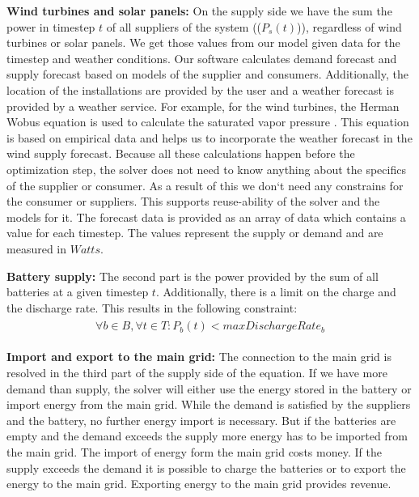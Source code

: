 \textbf{Wind turbines and solar panels:} On the supply side we have the sum the power in timestep $t$ of all suppliers of the system (($P_{s}(t)$)), regardless of wind turbines or solar panels.
We get those values from our model given data for the timestep and weather conditions. 
Our software calculates demand forecast and supply forecast based on models of the supplier and consumers. 
Additionally, the location of the installations are provided by the user and a weather forecast is provided by a weather service. 
For example, for the wind turbines, the Herman Wobus equation is used to calculate the saturated vapor pressure \cite{NOAA}. 
This equation is based on empirical data and helps us to incorporate the weather forecast in the wind supply forecast. 
Because all these calculations happen before the optimization step, the solver does not need to know anything about the specifics of the supplier or consumer. As a result of this we don`t need any constrains for the consumer or suppliers. 
This supports reuse-ability of the solver and the models for it. 
The forecast data is provided as an array of data which contains a value for each timestep. 
The values represent the supply or demand and are measured in $Watts$.  %

\textbf{Battery supply:} The second part is the power provided by the sum of all batteries at a given timestep $t$. Additionally, there is a limit on the charge and the discharge rate. This results in the following constraint:
\begin{align} \label{eq:limitDischarge}
\begin{split}
\forall b \in B, \forall t \in T: P_{b}(t) < maxDischargeRate_{b}
\end{split}
\end{align}

\textbf{Import and export to the main grid:} The connection to the main grid is resolved in the third part of the supply side of the equation.
If we have more demand than supply, the solver will either use the energy stored in the battery or import energy from the main grid. While the demand is satisfied by the suppliers and the battery, no further energy import is necessary. But if the batteries are empty and the demand exceeds the supply more energy has to be imported from the main grid. The import of energy form the main grid costs money. If the supply exceeds the demand it is possible to charge the batteries or to export the energy to the main grid. Exporting energy to the main grid provides revenue.

